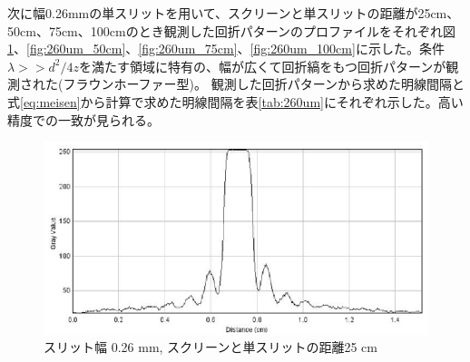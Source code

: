 \documentclass[11pt,a4]{jarticle}
\begin{document}
次に幅0.26mmの単スリットを用いて、スクリーンと単スリットの距離が25cm、50cm、75cm、100cmのとき観測した回折パターンのプロファイルをそれぞれ図\ref{fig:260um_25cm}、\ref{fig:260um_50cm}、\ref{fig:260um_75cm}、\ref{fig:260um_100cm}に示した。条件$\lambda >> d^2 /4z$を満たす領域に特有の、幅が広くて回折縞をもつ回折パターンが観測された(フラウンホーファー型)。
観測した回折パターンから求めた明線間隔と式\ref{eq:meisen}から計算で求めた明線間隔を表\ref{tab:260um}にそれぞれ示した。高い精度での一致が見られる。

\begin{figure}[htbp]
   \begin{center}
    \includegraphics[width=0.48\hsize]{./260um_25cm_profile.eps}
    \caption{スリット幅 0.26 mm, スクリーンと単スリットの距離25 cm}
     \label{fig:260um_25cm}
   \end{center}
\end{figure}
\end{document}
